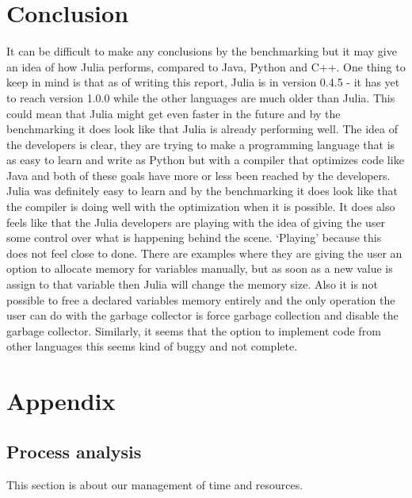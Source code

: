 \documentclass[a4paper, 11pt, titlepage]{article}
\begin{document}
\section{Conclusion}
It can be difficult to make any conclusions by the benchmarking but it may give an idea of how Julia performs, compared to Java, Python and C++. One thing to keep in mind is that as of writing this report, Julia is in version 0.4.5 - it has yet to reach version 1.0.0 while the other languages are much older than Julia. This could mean that Julia might get even faster in the future and by the benchmarking it does look like that Julia is already performing well. The idea of the developers is clear, they are trying to make a programming language that is as easy to learn and write as Python but with a compiler that optimizes code like Java and both of these goals have more or less been reached by the developers. Julia was definitely easy to learn and by the benchmarking it does look like that the compiler is doing well with the optimization when it is possible. It does also feels like that the Julia developers are playing with the idea of giving the user some control over what is happening behind the scene. ‘Playing’ because this does not feel close to done. There are examples where they are giving the user an option to allocate memory for variables manually, but as soon as a new value is assign to that variable then Julia will change the memory size. Also it is not possible to free a declared variables memory entirely and the only operation the user can do with the garbage collector is force garbage collection and disable the garbage collector. Similarly, it seems that the option to implement code from other languages this seems kind of buggy and not complete.

\newpage
\section{Appendix}
\subsection{Process analysis}
This section is about our management of time and resources.
\end{document}
